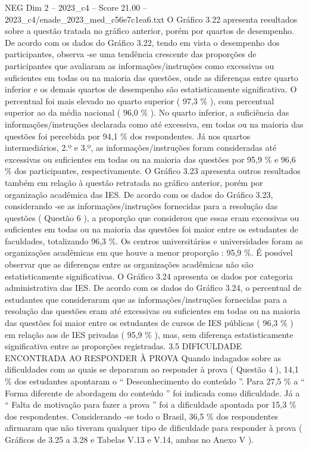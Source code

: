 \begin{textsample}{NEG Dim 2 – 2023\_c4 – Score 21.00 – 2023\_c4/enade\_2023\_med\_c56e7c1ea6.txt}
O Gráfico 3.22 apresenta resultados sobre a questão tratada no gráfico anterior, porém por quartos de desempenho.
De acordo com os dados do Gráfico 3.22, tendo em vista o desempenho dos participantes, observa -se uma tendência crescente das proporções de participantes que avaliaram as informações/instruções como excessivas ou suficientes em todas ou na maioria das questões, onde as diferenças entre quarto inferior e os demais quartos de desempenho são estatisticamente significativa.
O percentual foi mais elevado no quarto superior ( 97,3 \% ), com percentual superior ao da média nacional ( 96,0 \% ).
No quarto inferior, a suficiência das informações/instruções declarada como até excessiva, em todas ou na maioria das questões foi percebida por 94,1 \% dos respondentes.
Já nos quartos intermediários, 2.º e 3.º, as informações/instruções foram consideradas até excessivas ou suficientes em todas ou na maioria das questões por 95,9 \% e 96,6 \% dos participantes, respectivamente.
O Gráfico 3.23 apresenta outros resultados também em relação à questão retratada no gráfico anterior, porém por organização acadêmica das IES.
De acordo com os dados do Gráfico 3.23, considerando -se as informações/instruções fornecidas para a resolução das questões ( Questão 6 ), a proporção que considerou que essas eram excessivas ou suficientes em todas ou na maioria das questões foi maior entre os estudantes de faculdades, totalizando 96,3 \%.
Os centros universitários e universidades foram as organizações acadêmicas em que houve a menor proporção : 95,9 \%.
É possível observar que as diferenças entre as organizações acadêmicas não são estatisticamente significativas.
O Gráfico 3.24 apresenta os dados por categoria administrativa das IES.
De acordo com os dados do Gráfico 3.24, o percentual de estudantes que consideraram que as informações/instruções fornecidas para a resolução das questões eram até excessivas ou suficientes em todas ou na maioria das questões foi maior entre os estudantes de cursos de IES públicas ( 96,3 \% ) em relação aos de IES privadas ( 95,9 \% ), mas, sem diferença estatisticamente significativa entre as proporções registradas. 3.5 DIFICULDADE ENCONTRADA AO RESPONDER À PROVA Quando indagados sobre as dificuldades com as quais se depararam ao responder à prova ( Questão 4 ), 14,1 \% dos estudantes apontaram o “ Desconhecimento do conteúdo ”.
Para 27,5 \% a “ Forma diferente de abordagem do conteúdo ” foi indicada como dificuldade.
Já a “ Falta de motivação para fazer a prova ” foi a dificuldade apontada por 15,3 \% dos respondentes.
Considerando -se todo o Brasil, 36,5 \% dos respondentes afirmaram que não tiveram qualquer tipo de dificuldade para responder à prova ( Gráficos de 3.25 a 3.28 e Tabelas V.13 e V.14, ambas no Anexo V ).

\end{textsample}
